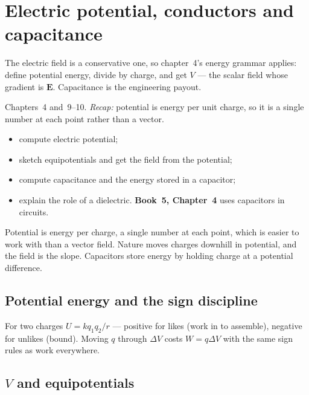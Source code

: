 \chapter{Electric potential, conductors and capacitance}\label{ch:pot}

The electric field is a conservative one, so chapter~4's energy grammar
applies: define potential energy, divide by charge, and get $V$ --- the
scalar field whose gradient is $\mathbf E$. Capacitance is the
engineering payout.

\begin{rulebox}
Chapters~4 and~9--10. \emph{Recap:} potential is energy per unit charge, so it is a single number at each point rather than a vector.
\end{rulebox}
\begin{wins}
\begin{itemize}
\item compute electric potential;
\item sketch equipotentials and get the field from the potential;
\item compute capacitance and the energy stored in a capacitor;
\item explain the role of a dielectric. \textbf{Book~5, Chapter~4} uses capacitors in circuits.
\end{itemize}
\end{wins}
\begin{principle}
Potential is energy per charge, a single number at each point, which is easier to work with than a vector field. Nature moves charges downhill in potential, and the field is the slope. Capacitors store energy by holding charge at a potential difference.
\end{principle}

\section{Potential energy and the sign discipline}\label{sec:pot-u}

For two charges $U=kq_1q_2/r$ --- positive for likes (work in to
assemble), negative for unlikes (bound). Moving $q$ through
$\Delta V$ costs $W=q\Delta V$ with the same sign rules as work
everywhere.

\section{$V$ and equipotentials}\label{sec:pot-v}

